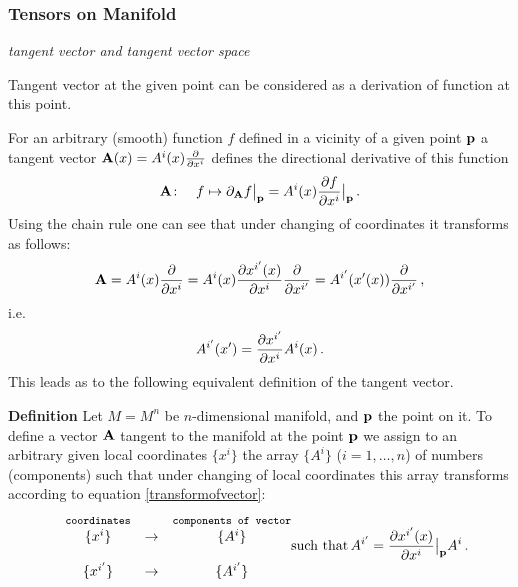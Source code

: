 \documentclass[12pt]{article}
\theoremstyle{theorem}
\numberwithin{equation}{section}
\begin{document}
  \subsubsection{ Tensors on Manifold}


{\it tangent vector and tangent vector space}

\smallskip

 Tangent vector at the given point
can be considered as a derivation of function at this point.


  For an arbitrary (smooth)
function $f$ defined in a vicinity of a given 
 point ${\bf p}$ a tangent vector ${\bf A}(x)=A^i(x){\partial\over \partial x^i}$
defines the directional derivative of this function 
      \begin{equation*} 
 {\bf A}\colon \quad 
   f \mapsto  \partial_{\bf A} f\big\vert_{\bf p}=A^i(x)
{\partial f\over \partial x^i}\big\vert_{{\bf p}}\,.    
      \end{equation*} 
Using the chain rule 
one can see that
under changing of coordinates 
it transforms as follows: 
             $$
         {\bf A}=A^i(x){\partial\over \partial x^i}=
A^i(x){\partial x^{i'}(x)\over \partial x^i}{\partial\over \partial x^{i'}}=
         A^{i'}(x'(x)){\partial\over \partial x^{i'}}\,,
             $$
i.e.
            \begin{equation}\label{transformofvector}
                   A^{i'}(x')={\partial x^{i'}\over \partial x^i}A^i(x)\,.
            \end{equation}
     This leads as to the following equivalent definition
of the tangent vector.

\smallskip

{\bf Definition}   Let $M=M^n$ be $n$-dimensional
manifold, and ${\bf p}$ the point on it.
To define a  vector ${\bf A}$ tangent to the 
manifold  at the point ${\bf p}$
we assign to an
arbitrary   
given local coordinates $\{x^i\}$
the array $\{A^i\}$ ($i=1,\dots,n$)
of numbers (components) 
such that under changing of local coordinates
this array  transforms  according to equation
\eqref{transformofvector}: 
         \begin{equation}\label{definitionofvector}
  \begin{matrix}
&\hbox{{\tt {\footnotesize coordinates}}}
 &            
&\hbox{{\tt {\footnotesize components of vector}}}\cr
&\{x^i\}   &\rightarrow
     &   \{A^i\}\cr
 &&&\cr
&\{x^{i'}\}   &\rightarrow
     &   \{A^{i'}\}\cr
      \end{matrix}\hbox{such that}\, 
      A^{i'}=
{\partial x^{i'}(x)\over \partial x^i}\big\vert_{\bf p}  A^i\,.  
        \end{equation}
\end{document}
